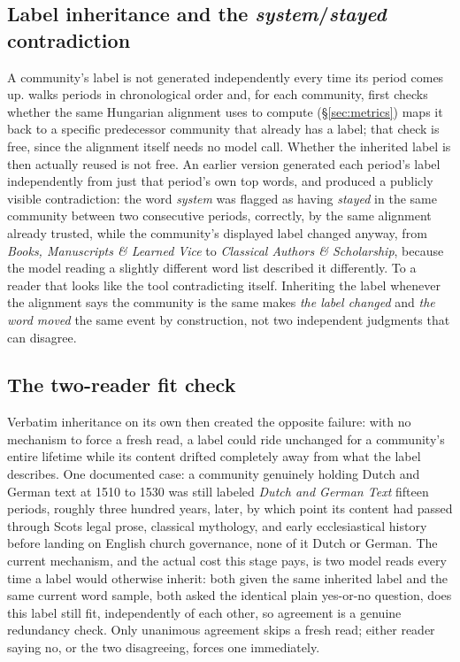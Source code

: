\documentclass[11pt]{article}
\begin{document}
\subsection{Label inheritance and the \emph{system}/\emph{stayed} contradiction}

A community's label is not generated independently every time its
period comes up.  walks periods in chronological order
and, for each community, first checks whether the same Hungarian
alignment  uses to compute 
(\S\ref{sec:metrics}) maps it back to a specific predecessor community
that already has a label; that check is free, since the alignment
itself needs no model call. Whether the inherited label is then actually
reused is not free. An earlier version generated each period's label
independently from just that period's own top words, and produced a
publicly visible contradiction: the word \emph{system} was
flagged as having \emph{stayed} in the same community between two
consecutive periods, correctly, by the same alignment 
already trusted, while the community's displayed label changed anyway,
from \emph{Books, Manuscripts \& Learned Vice} to \emph{Classical
Authors \& Scholarship}, because the model reading a slightly different
word list described it differently. To a reader that looks like the
tool contradicting itself. Inheriting the label whenever the alignment
says the community is the same makes \emph{the label changed} and
\emph{the word moved} the same event by construction, not two
independent judgments that can disagree.

\subsection{The two-reader fit check}

Verbatim inheritance on its own then created the opposite failure: with
no mechanism to force a fresh read, a label could ride unchanged for a
community's entire lifetime while its content drifted completely away
from what the label describes. One documented case: a community
genuinely holding Dutch and German text at 1510 to 1530 was still
labeled \emph{Dutch and German Text} fifteen periods, roughly three
hundred years, later, by which point its content had passed through
Scots legal prose, classical mythology, and early ecclesiastical history
before landing on English church governance, none of it Dutch or
German. The current mechanism, and the actual cost this stage pays, is
two model reads every time a label would otherwise inherit: both given
the same inherited label and the same current word sample, both asked
the identical plain yes-or-no question, does this label still fit,
independently of each other, so agreement is a genuine redundancy
check. Only unanimous agreement skips a fresh read; either reader
saying no, or the two disagreeing, forces one immediately.
\end{document}
